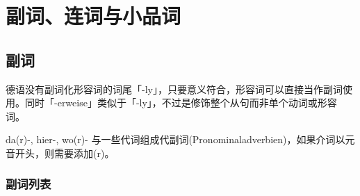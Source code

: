 \section{副词、连词与小品词}
\subsection{副词}
德语没有副词化形容词的词尾「-ly」，只要意义符合，形容词可以直接当作副词使用。同时「-erweise」类似于「-ly」，不过是修饰整个从句而非单个动词或形容词。

da(r)-, hier-, wo(r)- 与一些代词组成代副词(Pronominaladverbien)，如果介词以元音开头，则需要添加(r)。

\subsubsection{副词列表}

